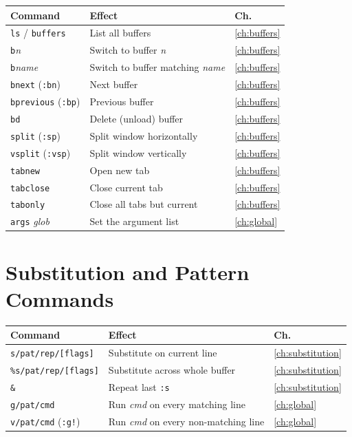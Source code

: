 \begin{longtable}{@{}l p{9cm} l@{}}
\textbf{Command} & \textbf{Effect} & \textbf{Ch.} \\
\hline
\endhead
\texttt{ls} / \texttt{buffers} & List all buffers & \ref{ch:buffers} \\
\texttt{b}\textit{n} & Switch to buffer \textit{n} & \ref{ch:buffers} \\
\texttt{b}\textit{name} & Switch to buffer matching \textit{name} & \ref{ch:buffers} \\
\texttt{bnext} (\texttt{:bn}) & Next buffer & \ref{ch:buffers} \\
\texttt{bprevious} (\texttt{:bp}) & Previous buffer & \ref{ch:buffers} \\
\texttt{bd} & Delete (unload) buffer & \ref{ch:buffers} \\
\texttt{split} (\texttt{:sp}) & Split window horizontally & \ref{ch:buffers} \\
\texttt{vsplit} (\texttt{:vsp}) & Split window vertically & \ref{ch:buffers} \\
\texttt{tabnew} & Open new tab & \ref{ch:buffers} \\
\texttt{tabclose} & Close current tab & \ref{ch:buffers} \\
\texttt{tabonly} & Close all tabs but current & \ref{ch:buffers} \\
\texttt{args} \textit{glob} & Set the argument list & \ref{ch:global} \\
\end{longtable}

\section{Substitution and Pattern Commands}

\begin{longtable}{@{}l p{9cm} l@{}}
\textbf{Command} & \textbf{Effect} & \textbf{Ch.} \\
\hline
\endhead
\texttt{s/pat/rep/[flags]} & Substitute on current line & \ref{ch:substitution} \\
\texttt{\%s/pat/rep/[flags]} & Substitute across whole buffer & \ref{ch:substitution} \\
\texttt{\&} & Repeat last \texttt{:s} & \ref{ch:substitution} \\
\texttt{g/pat/cmd} & Run \textit{cmd} on every matching line & \ref{ch:global} \\
\texttt{v/pat/cmd} (\texttt{:g!}) & Run \textit{cmd} on every non-matching line & \ref{ch:global} \\
\end{longtable}

